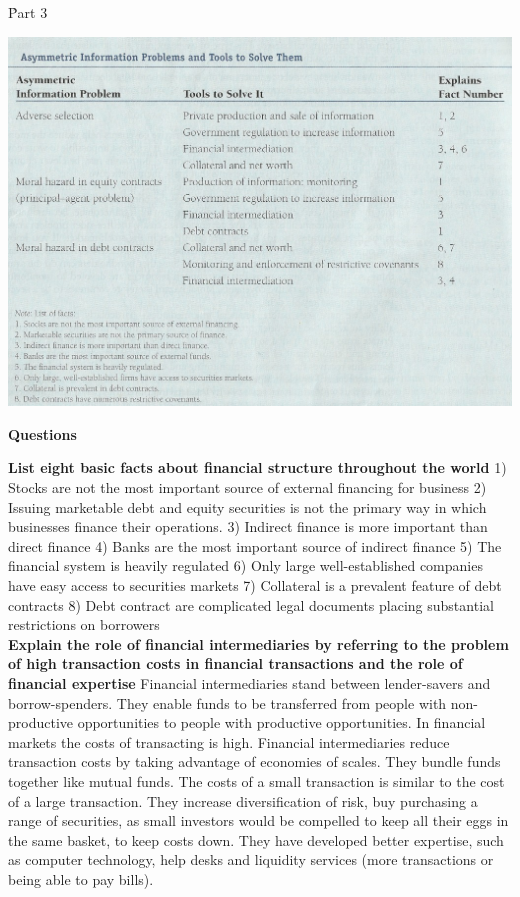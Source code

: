 \documentclass[12pt]{examnotes}
\begin{document}
\h{Part 3}
\begin{center}
  \includegraphics[scale=0.5]{./imgs/part3table.jpg}
\end{center}


\textbf{Questions}

\textbf{List eight basic facts about financial structure throughout the world}
1) Stocks are not the most important source of external financing for business
2) Issuing marketable debt and equity securities is not the primary way in which businesses finance their operations.
3) Indirect finance is more important than direct finance
4) Banks are the most important source of indirect finance
5) The financial system is heavily regulated
6) Only large well-established companies have easy access to securities markets
7) Collateral is a prevalent feature of debt contracts
8) Debt contract are complicated legal documents placing substantial restrictions on borrowers \\

\textbf{Explain the role of financial intermediaries by referring to the problem of high transaction costs in financial transactions and the role of financial expertise}
Financial intermediaries stand between lender-savers and borrow-spenders. They enable funds to be transferred from people with non-productive opportunities to people with productive opportunities. In financial markets the costs of transacting is high. Financial intermediaries reduce transaction costs by taking advantage of economies of scales. They bundle funds together like mutual funds. The costs of a small transaction is similar to the cost of a large transaction. They increase diversification of risk, buy purchasing a range of securities, as small investors would be compelled to keep all their eggs in the same basket, to keep costs down. They have developed better expertise, such as computer technology, help desks and liquidity services (more transactions or being able to pay bills).
\end{document}
